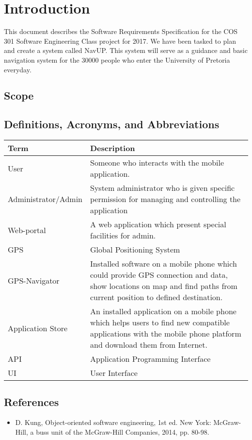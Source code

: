 \documentclass[12pt,a4paper]{article}
\begin{document}


\tableofcontents
\newpage

\section{Introduction}
This document describes the Software Requirements Specification for the COS 301 Software Engineering Class project for 2017. We have been tasked to plan and create a system called NavUP. This system will serve as a guidance and basic navigation system for the 30000 people who enter the University of Pretoria everyday.
	\subsection{Scope}
	\subsection{Definitions, Acronyms, and Abbreviations}
		\begin{tabular}{|p{4cm}|p{10cm}|}
			\hline
				\textbf{Term} & \textbf{Description}\\
			\hline
				User & Someone who interacts with the mobile application.\\
			\hline
				Administrator/Admin & System administrator who is given specific permission for managing and controlling the application\\
			\hline
				Web-portal & A web application which present special facilities for admin.\\
			\hline
				GPS & Global Positioning System\\
			\hline
				GPS-Navigator & Installed software on a mobile phone which could provide GPS
connection and data, show locations on map and find paths from current position to defined destination.\\
			\hline
				Application Store & An installed application on a mobile phone which helps users to find new compatible applications with the mobile phone platform and download them from Internet.\\
			\hline
				API & Application Programming Interface\\
			\hline
				UI & User Interface\\
			\hline
		\end{tabular}
	\subsection{References}
		\begin{itemize}
			\item D. Kung, Object-oriented software engineering, 1st ed. New York: McGraw-Hill, a buss unit of the McGraw-Hill Companies, 2014, pp. 80-98.
		\end{itemize}
\end{document}

